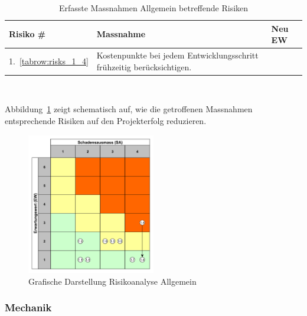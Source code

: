 \documentclass[main.tex]{subfiles} %
\begin{document}
\begin{table}[H]
    \begin{tabularx}{\textwidth}{|>{\centering\arraybackslash}p{2cm}|>{\raggedright\arraybackslash}X|>{\centering\arraybackslash}p{0.75cm}|}
        \hline
        \textbf{Risiko \#}        & \textbf{Massnahme}
                                  & \textbf{Neu EW}                                                        \\

        \hline
        \rowcolor{green!30}
        1.~\ref{tabrow:risks_1_4} & Kostenpunkte bei jedem Entwicklungsschritt frühzeitig berücksichtigen.
                                  & 1                                                                      \\
        \hline

    \end{tabularx}
    \caption{Erfasste Massnahmen Allgemein betreffende Risiken}~\label{tab:Erfasste_Massnahmen_allg}
\end{table}

Abbildung~\ref{fig:Diagramm_Risiko_allg} zeigt schematisch auf, wie die
getroffenen Massnahmen entsprechende Risiken auf den Projekterfolg reduzieren.

\begin{figure}[h]
    \centering
    \includegraphics[width=0.5\textwidth]{./Risks_Diagramm/Diagramm_Risiko_allg.pdf}
    \caption{Grafische Darstellung Risikoanalyse Allgemein}
    \label{fig:Diagramm_Risiko_allg}
\end{figure}


\subsubsection*{Mechanik}
\end{document}
